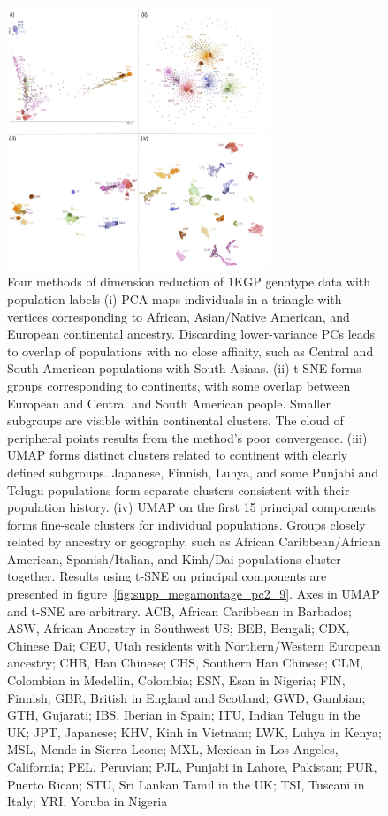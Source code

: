 \documentclass[12pt]{pnas-new}
\begin{document}
\begin{figure}[!ht]
    \centering
    \includegraphics[width=0.7\textwidth]{images/montage_1000G_labels_axes.pdf}
    \caption{Four methods of dimension reduction of 1KGP genotype data with population labels (i) PCA maps individuals in a triangle with vertices corresponding to African, Asian/Native American, and European continental ancestry. Discarding lower-variance PCs leads to overlap of populations with no close affinity, such as Central and South American populations with South Asians. (ii) t-SNE forms groups corresponding to continents, with some overlap between European and Central and South American people. Smaller subgroups are visible within continental clusters. The cloud of peripheral points results from the method's poor convergence. (iii) UMAP forms distinct clusters related to continent with clearly defined subgroups. Japanese, Finnish, Luhya, and some Punjabi and Telugu populations form separate clusters consistent with their population history\cite{10002015global}. (iv) UMAP on the first 15 principal components forms fine-scale clusters for individual populations. Groups closely related by ancestry or geography, such as African Caribbean/African American, Spanish/Italian, and Kinh/Dai populations cluster together. Results using t-SNE on principal components are presented in figure~\ref{fig:supp_megamontage_pc2_9}. Axes in UMAP and t-SNE are arbitrary.
    ACB, African Caribbean in Barbados;
    ASW, African Ancestry in Southwest US;
    BEB, Bengali;
    CDX, Chinese Dai;
    CEU, Utah residents with Northern/Western European ancestry;
    CHB, Han Chinese;
    CHS, Southern Han Chinese;
    CLM, Colombian in Medellin, Colombia;
    ESN, Esan in Nigeria;
    FIN, Finnish;
    GBR, British in England and Scotland;
    GWD, Gambian;
    GTH, Gujarati;
    IBS, Iberian in Spain;
    ITU, Indian Telugu in the UK;
    JPT, Japanese;
    KHV, Kinh in Vietnam;
    LWK, Luhya in Kenya;
    MSL, Mende in Sierra Leone;
    MXL, Mexican in Los Angeles, California;
    PEL, Peruvian;
    PJL, Punjabi in Lahore, Pakistan;
    PUR, Puerto Rican;
    STU, Sri Lankan Tamil in the UK;
    TSI, Tuscani in Italy;
    YRI, Yoruba in Nigeria}
    \label{fig:1000g_compare}
\end{figure}
\end{document}
